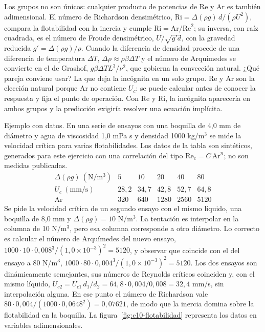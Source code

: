 \documentclass[10pt,openany]{book}
\begin{document}
Los grupos no son únicos: cualquier producto de potencias de \(\mathrm{Re}\) y \(\mathrm{Ar}\) es también adimensional. El número de Richardson densimétrico, \(\mathrm{Ri} = \Delta(\rho g)\,d/(\rho U^{2})\), compara la flotabilidad con la inercia y cumple \(\mathrm{Ri} = \mathrm{Ar}/\mathrm{Re}^{2}\); su inversa, con raíz cuadrada, es el número de Froude densimétrico, \(U/\sqrt{g' d}\), con la gravedad reducida \(g' = \Delta(\rho g)/\rho\). Cuando la diferencia de densidad procede de una diferencia de temperatura \(\Delta T\), \(\Delta\rho \approx \rho\beta\Delta T\) y el número de Arquímedes se convierte en el de Grashof, \(g\beta\Delta T L^{3}/\nu^{2}\), que gobierna la convección natural. ¿Qué pareja conviene usar? La que deja la incógnita en un solo grupo. \(\mathrm{Re}\) y \(\mathrm{Ar}\) son la elección natural porque \(\mathrm{Ar}\) no contiene \(U_c\): se puede calcular antes de conocer la respuesta y fija el punto de operación. Con \(\mathrm{Re}\) y \(\mathrm{Ri}\), la incógnita aparecería en ambos grupos y la predicción exigiría resolver una ecuación implícita.

Ejemplo con datos. En una serie de ensayos con una boquilla de 4,0 mm de diámetro y agua de viscosidad 1,0 mPa s y densidad 1000 kg/m\(^3\) se mide la velocidad crítica para varias flotabilidades. Los datos de la tabla son sintéticos, generados para este ejercicio con una correlación del tipo \(\mathrm{Re}_c = C\,\mathrm{Ar}^{n}\); no son medidas publicadas.
\[
\begin{array}{c|ccccc}
\Delta(\rho g)\ (\mathrm{N/m^{3}}) & 5 & 10 & 20 & 40 & 80 \\ \hline
U_c\ (\mathrm{mm/s}) & 28{,}2 & 34{,}7 & 42{,}8 & 52{,}7 & 64{,}8 \\
\mathrm{Ar} & 320 & 640 & 1280 & 2560 & 5120
\end{array}
\]
Se pide la velocidad crítica de un segundo ensayo con el mismo líquido, una boquilla de 8,0 mm y \(\Delta(\rho g) = 10\) N/m\(^3\). La tentación es interpolar en la columna de 10 N/m\(^3\), pero esa columna corresponde a otro diámetro. Lo correcto es calcular el número de Arquímedes del nuevo ensayo, \(1000\cdot 10\cdot 0{,}008^3/(1{,}0\times 10^{-3})^2 = 5120\), y observar que coincide con el del ensayo a 80 N/m\(^3\), \(1000\cdot 80\cdot 0{,}004^3/(1{,}0\times 10^{-3})^2 = 5120\). Los dos ensayos son dinámicamente semejantes, sus números de Reynolds críticos coinciden y, con el mismo líquido, \(U_{c2} = U_{c1}\,d_1/d_2 = 64{,}8\cdot 0{,}004/0{,}008 = 32{,}4\) mm/s, sin interpolación alguna. En ese punto el número de Richardson vale \(80\cdot 0{,}004/(1000\cdot 0{,}0648^2) = 0{,}07621\), de modo que la inercia domina sobre la flotabilidad en la boquilla. La figura~\ref{fig:c10-flotabilidad} representa los datos en variables adimensionales.
\end{document}
